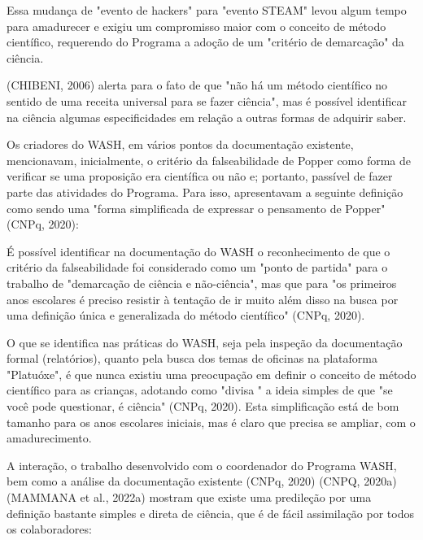 Essa mudança de "evento de hackers" para "evento STEAM" levou algum tempo para amadurecer e exigiu um compromisso maior com o conceito de método científico, requerendo do Programa a adoção de um "critério de demarcação" da ciência.

(CHIBENI, 2006) alerta para o fato de que "não há um método científico no sentido de uma receita universal para se fazer ciência", mas é possível identificar na ciência algumas especificidades em relação a outras formas de adquirir saber.

Os criadores do WASH, em vários pontos da documentação existente, mencionavam, inicialmente, o critério da falseabilidade de Popper como forma de verificar se uma proposição era científica ou não e; portanto, passível de fazer parte das atividades do Programa. Para isso, apresentavam a seguinte definição como sendo uma "forma simplificada de expressar o pensamento de Popper" (CNPq, 2020):


\noindent\begin{flushright}\mbox{\linespread{1}\selectfont\centering{}}\end{flushright}


É possível identificar na documentação do WASH o reconhecimento de que o critério da falseabilidade foi considerado como um "ponto de partida" para o trabalho de "demarcação de ciência e não-ciência", mas que para "os primeiros anos escolares é preciso resistir à tentação de ir muito além disso na busca por uma definição única e generalizada do método científico" (CNPq, 2020).

O que se identifica nas práticas do WASH, seja pela inspeção da documentação formal (relatórios), quanto pela busca dos temas de oficinas na plataforma "Platuóxe", é que nunca existiu uma preocupação em definir o conceito de método científico para as crianças, adotando como "divisa " a ideia simples de que "se você pode questionar, é ciência" (CNPq, 2020). Esta simplificação está de bom tamanho para os anos escolares iniciais, mas é claro que precisa se ampliar, com o amadurecimento.

A interação, o trabalho desenvolvido com o coordenador do Programa WASH, bem como a análise da documentação existente (CNPq, 2020)  (CNPQ, 2020a)  (MAMMANA et al., 2022a) mostram que existe uma predileção por uma definição bastante simples e direta de ciência, que é de fácil assimilação por todos os colaboradores:


